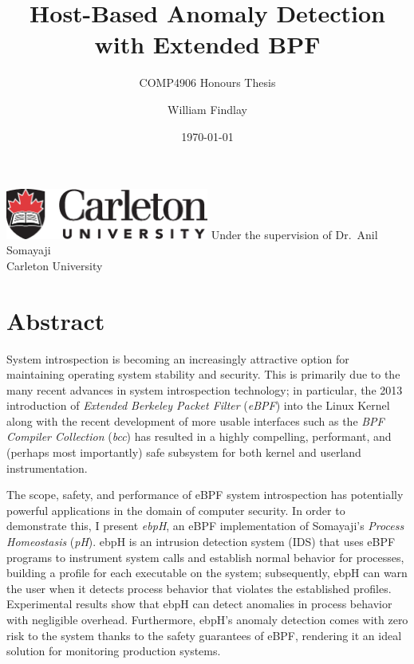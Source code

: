 \documentclass[
  12pt]{findlay}
\title{Host-Based Anomaly Detection with Extended BPF}
\subtitle{COMP4906 Honours Thesis}
\author{William Findlay}
\date{\today}
\begin{document}
\pagestyle{fancy}

\maketitle
\thispagestyle{empty}

\begin{center}
    \large
    \vfill
    \includegraphics[width=0.5\textwidth]{logo/CarletonWide_K_186}
    \vfill
    Under the supervision of Dr.\ Anil Somayaji\\
    Carleton University
    \vfill
\end{center}

\onehalfspacing

\clearpage
{}
\section*{Abstract}

System introspection is becoming an increasingly attractive option for
maintaining operating system stability and security. This is primarily
due to the many recent advances in system introspection technology; in
particular, the 2013 introduction of \emph{Extended Berkeley Packet
Filter} (\emph{eBPF}) into the Linux Kernel
\autocite{starovoitov13,starovoitov14} along with the recent development
of more usable interfaces such as the \emph{BPF Compiler Collection}
(\emph{bcc}) \autocite{bcc} has resulted in a highly compelling,
performant, and (perhaps most importantly) safe subsystem for both
kernel and userland instrumentation.

The scope, safety, and performance of eBPF system introspection has
potentially powerful applications in the domain of computer security. In
order to demonstrate this, I present \emph{ebpH}, an eBPF implementation
of Somayaji's \autocite{soma02} \emph{Process Homeostasis} (\emph{pH}).
ebpH is an intrusion detection system (IDS) that uses eBPF programs to
instrument system calls and establish normal behavior for processes,
building a profile for each executable on the system; subsequently, ebpH
can warn the user when it detects process behavior that violates the
established profiles. Experimental results show that ebpH can detect
anomalies in process behavior with negligible overhead. Furthermore,
ebpH's anomaly detection comes with zero risk to the system thanks to
the safety guarantees of eBPF, rendering it an ideal solution for
monitoring production systems.
\end{document}
